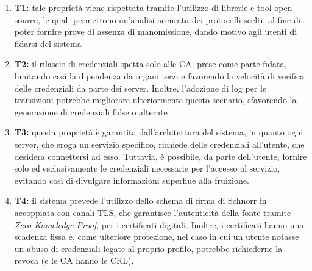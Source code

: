         \begin{enumerate}
            \item \textbf{T1:} tale proprietà viene rispettata tramite l'utilizzo di librerie e tool open source, le quali permettono un'analisi accurata dei protocolli scelti, al fine di poter fornire prove di assenza di manomissione, dando motivo agli utenti di fidarsi del sistema

            \item \textbf{T2:} il rilascio di credenziali spetta solo alle CA, prese come parte fidata, limitando così la dipendenza da organi terzi e favorendo la velocità di verifica delle credenziali da parte dei server.
            Inoltre, l'adozione di log per le transizioni potrebbe migliorare ulteriormente questo scenario, sfavorendo la generazione di credenziali false o alterate

            \item \textbf{T3:} questa proprietà è garantita dall'architettura del sistema, in quanto ogni server, che eroga un servizio specifico, richiede delle credenziali all'utente, che desidera connettersi ad esso.
            Tuttavia, è possibile, da parte dell'utente, fornire solo ed esclusivamente le credenziali necessarie per l'accesso al servizio, evitando così di divulgare informazioni superflue alla fruizione.

            \item \textbf{T4:} il sistema prevede l'utilizzo dello schema di firma di Schnorr in accoppiata con canali TLS, che garantisce l'autenticità della fonte tramite \textit{Zero Knowledge Proof}, per i certificati digitali.
            Inoltre, i certificati hanno una scadenza fissa e, come ulteriore protezione, nel caso in cui un utente notasse un abuso di credenziali legate al proprio profilo, potrebbe richiederne la revoca (e le CA hanno le CRL).
            
        \end{enumerate}

